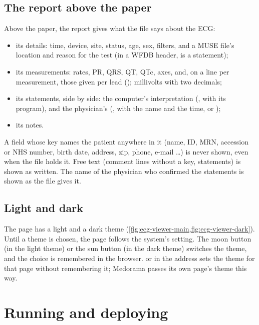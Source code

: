 \subsection{The report above the paper}
\label{sec:ecg-viewer-report}

Above the paper, the report gives what the file says about the ECG:
\begin{itemize}
\item its details: time, device, site, status, age, sex, filters, and a MUSE file's location and
  reason for the test (in a WFDB header,  is a statement);
\item its measurements: rates, PR, QRS, QT, QTc, axes, and, on a line per measurement, those
  given per lead (); millivolts with two decimals;
\item its statements, side by side: the computer's interpretation (,
  with its program), and the physician's (, with the name and the time, or
  );
\item its notes.
\end{itemize}

\begin{phibox}
A field whose key names the patient anywhere in it (name, ID, MRN, accession or NHS number,
birth date, address, zip, phone, e-mail \dots) is never shown, even when the file holds it. Free
text (comment lines without a key, statements) is shown as written. The name of the physician
who confirmed the statements is shown as the file gives it.
\end{phibox}

\subsection{Light and dark}
\label{sec:ecg-viewer-themes}

The page has a light and a dark theme (\cref{fig:ecg-viewer-main,fig:ecg-viewer-dark}). Until a
theme is chosen, the page follows the system's setting. The moon button (in the light theme) or
the sun button (in the dark theme) switches the theme, and the choice is remembered in the
browser.  or  in the address sets the theme for that page
without remembering it; Medorama passes its own page's theme this way.

\section{Running and deploying}
\label{sec:ecg-viewer-run}

